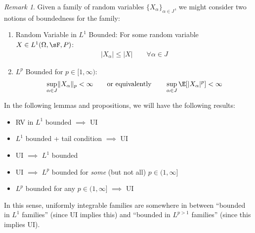 \documentclass[12pt]{article}
\theoremstyle{plain}
\theoremstyle{definition}
\theoremstyle{remark}
\newtheorem*{rmk}{Remark}
\begin{document}
\begin{rmk}
Given a family of random variables $\{X_\alpha\}_{\alpha \in J}$, we
might consider two notions of boundedness for the family:
\begin{enumerate}[label=(\roman*)]
  \item Random Variable in $L^1$ Bounded: For some random variable
    $X\in L^1(\Omega,\sF,P)$:
    \begin{align*}
      |X_\alpha|\leq |X|
      \qquad \forall \alpha \in J
    \end{align*}

  \item $L^p$ Bounded for $p\in[1,\infty)$:
    \begin{align*}
      \sup_{\alpha\in J} \lVert X_\alpha\rVert_p<\infty
      \qquad\text{or equivalently}\qquad
      \sup_{\alpha\in J} \E[|X_\alpha|^p]<\infty
    \end{align*}
\end{enumerate}
In the following lemmas and propositions, we will have the following
results:
\begin{itemize}
  \item RV in $L^1$ bounded $\implies$ UI
  \item $L^1$ bounded + tail condition $\implies$ UI
  \item UI $\implies$ $L^1$ bounded
  \item UI $\implies$ $L^p$ bounded for \emph{some} (but not all)
    $p \in (1,\infty]$
  \item $L^p$ bounded for any $p\in(1,\infty]$ $\implies$ UI
\end{itemize}
In this sense, uniformly integrable families are somewhere in between
``bounded in $L^1$ families'' (since UI implies this) and ``bounded in
$L^{p>1}$ families'' (since this implies UI).
\end{rmk}
\end{document}
